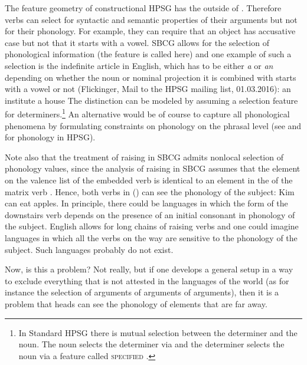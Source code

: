 \documentclass[output=paper]{langsci/langscibook}
\begin{document}

The feature geometry of constructional HPSG has the \phonv outside of \synsem. Therefore verbs can
select for syntactic and semantic properties of their arguments but not for their phonology. For
example, they can require that an object has accusative case but not that it starts with a
vowel. SBCG allows for the selection of phonological information (the feature is called \form here)
and one example of such a selection is the indefinite article in English, which has to be either \emph{a} or
\emph{an} depending on whether the noun or nominal projection it is combined with starts with a
vowel or not (Flickinger, Mail to the HPSG mailing list, 01.03.2016):
\eal
\ex an institute
\ex a  house
\zl
The distinction can be modeled by assuming a selection feature for determiners.\footnote{%
  In Standard HPSG there is mutual selection between the determiner and the noun. The noun selects
  the determiner via \spr and the determiner selects the noun via a feature called
  \textsc{specified} \citep[--54]{ps2}. 
} An alternative would be of course to capture all phonological phenomena by formulating constraints on phonology on the
phrasal level (see \citealp{BK94b} and \citealp{Walther99a-u} for phonology in HPSG).

Note also that the treatment of raising in SBCG admits nonlocal selection of phonology
values, since the analysis of raising in SBCG assumes that the element on the valence list of the
embedded verb is identical to an element in the \argstl of the matrix verb \citep[]{Sag2012a}. Hence, both verbs in () can see the phonology of the subject:
\ea
Kim can eat apples.
\z
In principle, there could be languages in which the form of the downstairs verb depends on the
presence of an initial consonant in phonology of the subject. English allows for long chains of
raising verbs and one could imagine languages in which all the verbs on the way are sensitive to the
phonology of the subject. Such languages probably do not exist.

Now, is this a problem? Not really, but if one develops a general setup in a
way to exclude everything that is not attested in the languages of the world (as for instance the
selection of arguments of arguments of arguments), then it is a problem that heads can see the
phonology of elements that are far away.
\end{document}
